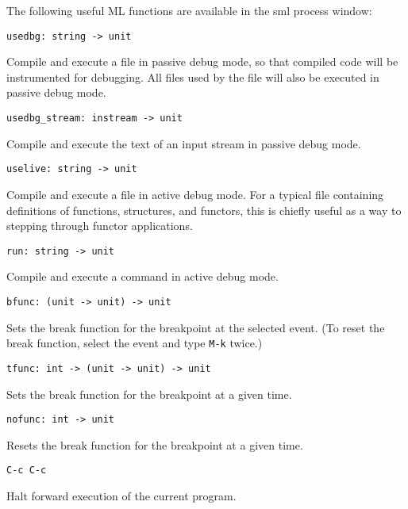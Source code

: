 The following useful ML functions are available in the sml process window:

\begin{verbatim}
usedbg: string -> unit
\end{verbatim}

Compile and execute a file in passive debug mode, so that compiled
code will be instrumented for debugging.  All files used by
the file will also be executed in passive debug mode.

\begin{verbatim}
usedbg_stream: instream -> unit
\end{verbatim}

Compile and execute the text of an input stream in passive debug mode.

\begin{verbatim}
uselive: string -> unit
\end{verbatim}

Compile and execute a file in active debug mode.  For a typical file
containing definitions of functions, structures, and functors, this
is chiefly useful as a way to stepping through functor applications.

\begin{verbatim}
run: string -> unit
\end{verbatim}

Compile and execute a command in active debug mode.

\begin{verbatim}
bfunc: (unit -> unit) -> unit
\end{verbatim}

Sets the break function for the breakpoint at the selected event.  (To
reset the break function, select the event and type \verb'M-k' twice.) 

\begin{verbatim}
tfunc: int -> (unit -> unit) -> unit
\end{verbatim}

Sets the break function for the breakpoint at a given time.

\begin{verbatim}
nofunc: int -> unit
\end{verbatim}

Resets the break function for the breakpoint at a given time.

\begin{verbatim}
C-c C-c
\end{verbatim}

Halt forward execution of the current program.


